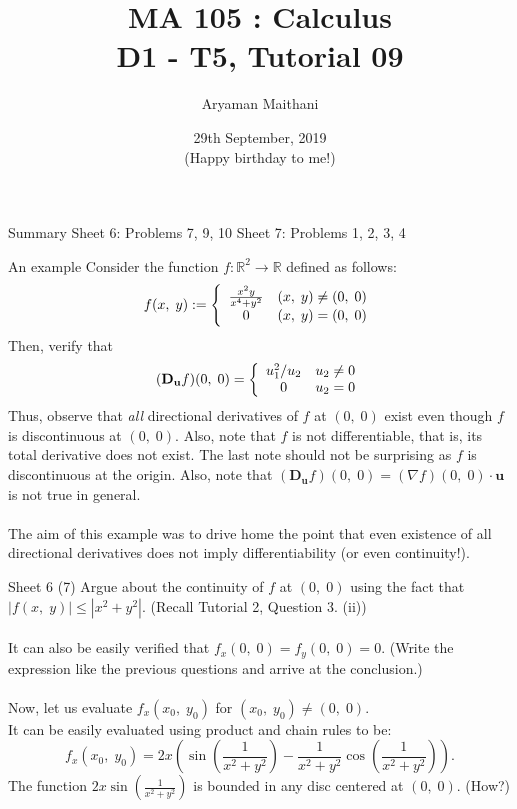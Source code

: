 \documentclass[handout, aspectratio=169]{beamer}
\title{MA 105 : Calculus\\ D1 - T5, Tutorial 09}  %
\author{Aryaman Maithani}
\date[29-09-2019]{29th September, 2019\\ \tiny (Happy birthday to me!)}               %
\institute[IITB]{IIT Bombay}
\begin{document}
\begin{frame}
	\titlepage
\end{frame}
\begin{frame}{Summary} 
	Sheet 6: Problems 7, 9, 10
	Sheet 7: Problems 1, 2, 3, 4
\end{frame}
\begin{frame}{An example}
	Consider the function $f:\mathbb{R}^2 \to \mathbb{R}$ defined as follows:
	\[f(x,\;y) := \left\{
	\begin{array}{c c}
		\frac{x^2y}{x^4 + y^2} & (x,\; y) \neq (0,\;0)\\
		0 & (x,\;y) = (0,\;0)
	\end{array}
	\right.\]
	Then, verify that
	\[(\mathbf{D_{u}}f)(0,\;0) = \left\{
	\begin{array}{c c}
		u_1^2/u_2 & u_2 \neq 0\\
		0 & u_2 = 0
	\end{array}
	\right.\]
	Thus, observe that \emph{all} directional derivatives of $f$ at $(0,\;0)$ exist even though $f$ is discontinuous at $(0,\;0).$ Also, note that $f$ is not differentiable, that is, its total derivative does not exist. The last note should not be surprising as $f$ is discontinuous at the origin. Also, note that $(\mathbf{D_u}f)(0,\;0) = (\nabla f)(0,\;0)\cdot\mathbf{u}$ is not true in general.\\~\\
	The aim of this example was to drive home the point that even existence of all directional derivatives does not imply differentiability (or even continuity!).
\end{frame}
\begin{frame}{Sheet 6}
	(7) Argue about the continuity of $f$ at $(0,\;0)$ using the fact that $|f(x,\;y)| \le |x^2 + y^2|.$ (Recall Tutorial 2, Question 3. (ii))\\~\\
	It can also be easily verified that $f_x(0,\;0) = f_y(0,\;0) = 0.$ (Write the expression like the previous questions and arrive at the conclusion.)\\~\\
	Now, let us evaluate $f_x(x_0,\;y_0)$ for $(x_0,\;y_0) \neq (0,\;0).$\\
	It can be easily evaluated using product and chain rules to be:
	\[f_x(x_0,\;y_0) = 2x\left(\sin\left(\frac{1}{x^2 + y^2}\right) - \frac{1}{x^2 + y^2}\cos\left(\frac{1}{x^2 + y^2}\right)\right).\]
	The function $\displaystyle2x\sin\left(\frac{1}{x^2 + y^2}\right)$ is bounded in any disc centered at $(0,\;0).$ \hfill (How?)\\
\end{frame}
	
\end{document}
